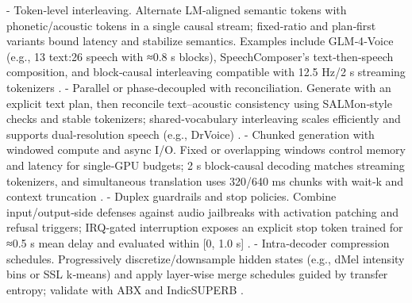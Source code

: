 \documentclass{article}
\begin{document}
- Token‑level interleaving. Alternate LM‑aligned semantic tokens with phonetic/acoustic tokens in a single causal stream; fixed‑ratio and plan‑first variants bound latency and stabilize semantics. Examples include GLM‑4‑Voice (e.g., 13 text:26 speech with ≈0.8 s blocks), SpeechComposer’s text‑then‑speech composition, and block‑causal interleaving compatible with 12.5 Hz/2 s streaming tokenizers \cite{zeng2024glm4voicetowardsintelligenthumanlikeends,wu2024speechcomposerunifyingmultiplespeechtask,zeng2024scalingspeechtextpretrainingsyntheticint,har-tuv2025pastphoneticacousticspeechtokenizer,jo2025lmsptalignedsemanticdistillationspeechto,vashishth2024stabspeechtokenizerassessmentbenchmark,cui2025thinkbeforeyoutalkenhancingmeaningfuldia}.
- Parallel or phase‑decoupled with reconciliation. Generate with an explicit text plan, then reconcile text–acoustic consistency using SALMon‑style checks and stable tokenizers; shared‑vocabulary interleaving scales efficiently and supports dual‑resolution speech (e.g., DrVoice) \cite{maimon2025scalinganalysisinterleavedspeechtextlang,maimon2025salmonsuiteacousticlanguagemodelevaluati,tan2025drvoiceparallelspeechtextvoiceconversati,vashishth2024stabspeechtokenizerassessmentbenchmark,wu2024speechcomposerunifyingmultiplespeechtask,zeng2024glm4voicetowardsintelligenthumanlikeends}.
- Chunked generation with windowed compute and async I/O. Fixed or overlapping windows control memory and latency for single‑GPU budgets; 2 s block‑causal decoding matches streaming tokenizers, and simultaneous translation uses 320/640 ms chunks with wait‑k and context truncation \cite{zeng2024scalingspeechtextpretrainingsyntheticint,guo2025streamuniachievingstreamingspeechtransla,maimon2025slammingtrainingspeechlanguagemodelonegp,chen2023reducingbarriersselfsupervisedlearninghu}.
- Duplex guardrails and stop policies. Combine input/output‑side defenses against audio jailbreaks with activation patching and refusal triggers; IRQ‑gated interruption exposes an explicit stop token trained for ≈0.5 s mean delay and evaluated within [0, 1.0 s] \cite{peri2024speechguardexploringadversarialrobustnes,djanibekov2025spiritpatchingspeechlanguagemodelsagains,ma2024languagemodelcanlistenwhilespeaking}.
- Intra‑decoder compression schedules. Progressively discretize/downsample hidden states (e.g., dMel intensity bins or SSL k‑means) and apply layer‑wise merge schedules guided by transfer entropy; validate with ABX and IndicSUPERB \cite{bai2025dmelspeechtokenizationmadesimple,onda2025benchmarkingprosodyencodingdiscretespeec,poli2025fastabxlibraryefficientcomputationabxdis,entry2025indicsuperbspeechprocessinguniversalperf,lu2024fastadaspmultitaskadaptedefficientinfere}.
\end{document}
